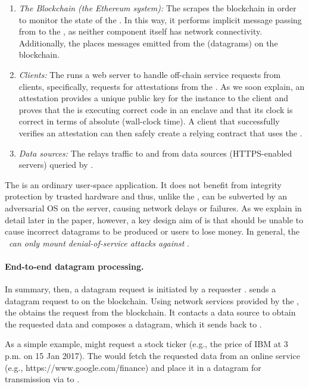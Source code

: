 \begin{enumerate}
\item {\em The Blockchain (the Ethereum system):}  The \medname scrapes the blockchain in order to monitor the state of the \tcontract  \tcont. In this way, it performs implicit message passing from \tcont to the \encname, as neither component itself has network connectivity. Additionally, the \medname places messages emitted from the \encname (datagrams) on the blockchain.
\item {\em Clients:} The \medname runs a web server to handle off-chain service requests from clients, specifically, requests for attestations from the \encname. As we soon explain, an attestation provides a unique public key for the \encname instance to the  client and proves that the \encname is executing correct code in an enclave and that its clock is correct in terms of absolute (wall-clock time). A client that successfully verifies an attestation can then safely create a relying contract \reqcont that uses the \tc.
\item {\em Data sources:} The \medname relays traffic to and from data sources (HTTPS-enabled servers) queried by \encname. 
\end{enumerate}

The \medname is an ordinary user-space application. It does not benefit from integrity protection by trusted hardware and thus, unlike the \encname, can be subverted by an adversarial OS on the \tc server, causing network delays or failures. As we explain in detail later in the paper, however, a key design aim of \tc is that \medname should be unable to cause incorrect datagrams to be produced or users to lose money. In general, the \medname~{\em can only mount denial-of-service attacks against \tc}. 

\paragraph{End-to-end datagram processing.}

In summary, then, a datagram request is initiated by a requester \reqcont. \reqcont sends a datagram request to \tcont on the blockchain. Using network services provided by the \medname, the \encname obtains the request from the blockchain. It contacts a data source to obtain the requested data and composes a datagram, which it sends back to \reqcont.

As a simple example, \reqcont might request a stock ticker  (e.g., the price of IBM at 3 p.m. on 15 Jan 2017). The \encname would fetch the requested data from an online service (e.g., https://www.google.com/finance) and place it in a datagram for transmission via \tcont to \reqcont.

